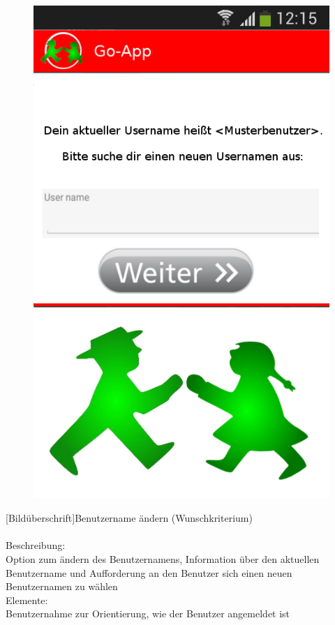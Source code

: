 \begin{figure}
	\includegraphics[scale =1]{resources/images/username_aendern.png}
\end{figure}
[Bildüberschrift]Benutzername ändern (Wunschkriterium)\\ \\
[Kleinüberschrift]Beschreibung:\\
Option zum ändern des Benutzernamens, Information über den aktuellen Benutzername und Aufforderung an den Benutzer sich einen neuen Benutzernamen zu wählen\\
[Kleinüberschrift]Elemente:\\
Benutzernahme zur Orientierung, wie der Benutzer angemeldet ist\\
